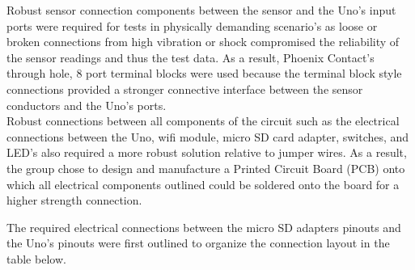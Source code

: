 \documentclass[12pt, titlepage]{article}
\begin{document}
Robust sensor connection components between the sensor and the Uno's input ports were required for tests in physically demanding scenario's as loose or broken connections from high vibration or shock compromised the reliability of the sensor readings and thus the test data. As a result, Phoenix Contact's through hole, 8 port terminal blocks were used because the terminal block style connections provided a stronger connective interface between the sensor conductors and the Uno's ports. \\

Robust connections between all components of the circuit such as the electrical connections between the Uno, wifi module, micro SD card adapter, switches, and LED's also required a more robust solution relative to jumper wires. As a result, the group chose to design and manufacture a Printed Circuit Board (PCB) onto which all electrical components outlined could be soldered onto the board for a higher strength connection. \\
\newpage

The required electrical connections between the micro SD adapters pinouts and the Uno's pinouts were first outlined to organize the connection layout in the table below. \\
\end{document}
